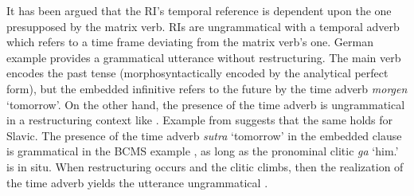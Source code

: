 \documentclass[output=paper,colorlinks,citecolor=brown]{langscibook}
\begin{document}
It has been argued that the RI’s temporal reference is dependent upon the one presupposed by the matrix verb. RIs are ungrammatical with a temporal adverb which refers to a time frame deviating from the matrix verb’s one.  German example  provides a grammatical utterance without restructuring. The main verb encodes the past tense (morphosyntactically encoded by the analytical perfect form), but the embedded infinitive refers to the future by the time adverb \textit{morgen} ‘tomorrow’. On the other hand, the presence of the time adverb is ungrammatical in a restructuring context like . Example  from \citet{Aljović2004} suggests that the same holds for Slavic. The presence of the time adverb \textit{sutra} ‘tomorrow’ in the embedded clause is grammatical in the BCMS example , as long as the pronominal clitic \textit{ga} ‘him.{\ACC}’ is in situ. When restructuring occurs and the clitic climbs, then the realization of the time adverb yields the utterance ungrammatical .

\ea\label{kul:ex:hans-hat}
\z
\z

\ea\label{kul:ex:on-zeli-da}
\z
\z
\end{document}
